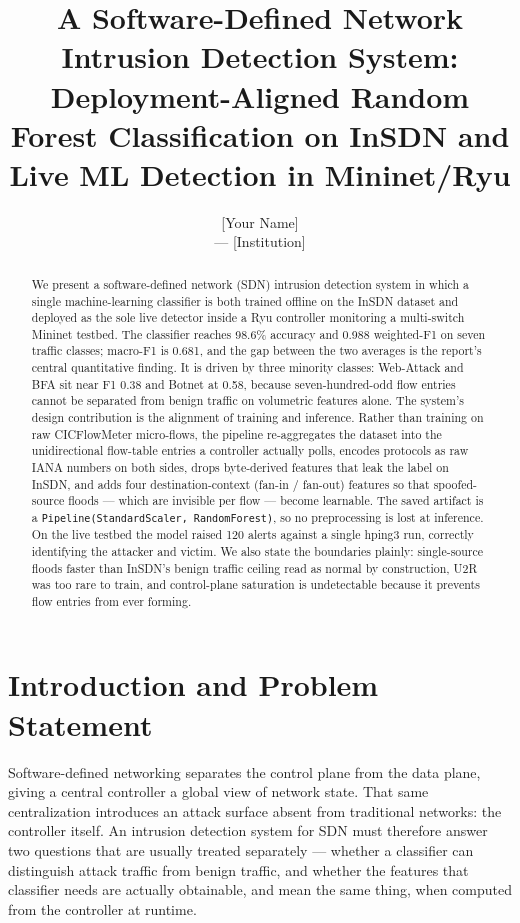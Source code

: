 \documentclass[11pt]{article}
\title{A Software-Defined Network Intrusion Detection System:\\
Deployment-Aligned Random Forest Classification on InSDN and\\
Live ML Detection in Mininet/Ryu}
\author{[Your Name] \\ [Course Code] --- [Institution]}
\date{}
\begin{document}
\maketitle

\begin{abstract}
We present a software-defined network (SDN) intrusion detection system in which a
single machine-learning classifier is both trained offline on the InSDN dataset and
deployed as the sole live detector inside a Ryu controller monitoring a multi-switch
Mininet testbed. The classifier reaches 98.6\% accuracy and 0.988 weighted-F1 on seven
traffic classes; macro-F1 is 0.681, and the gap between the two averages is the report's
central quantitative finding. It is driven by three minority classes: Web-Attack and BFA
sit near F1 0.38 and Botnet at 0.58, because seven-hundred-odd flow entries cannot be
separated from benign traffic on volumetric features alone. The system's design
contribution is the alignment of training and inference. Rather than training on raw
CICFlowMeter micro-flows, the pipeline re-aggregates the dataset into the unidirectional
flow-table entries a controller actually polls, encodes protocols as raw IANA numbers on
both sides, drops byte-derived features that leak the label on InSDN, and adds four
destination-context (fan-in / fan-out) features so that spoofed-source floods --- which
are invisible per flow --- become learnable. The saved artifact is a
\texttt{Pipeline(StandardScaler, RandomForest)}, so no preprocessing is lost at
inference. On the live testbed the model raised 120 alerts against a single hping3 run,
correctly identifying the attacker and victim. We also state the boundaries plainly:
single-source floods faster than InSDN's benign traffic ceiling read as normal by
construction, U2R was too rare to train, and control-plane saturation is undetectable
because it prevents flow entries from ever forming.
\end{abstract}

\section{Introduction and Problem Statement}
Software-defined networking separates the control plane from the data plane, giving a
central controller a global view of network state. That same centralization introduces
an attack surface absent from traditional networks: the controller itself. An intrusion
detection system for SDN must therefore answer two questions that are usually treated
separately --- whether a classifier can distinguish attack traffic from benign traffic,
and whether the features that classifier needs are actually obtainable, and mean the same
thing, when computed from the controller at runtime.
\end{document}
